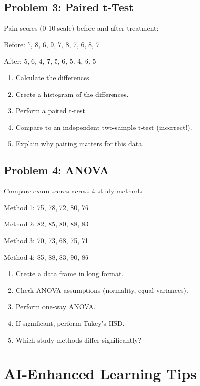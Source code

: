 \documentclass[11pt]{article}
\begin{document}
\subsection{Problem 3: Paired t-Test}

Pain scores (0-10 scale) before and after treatment:

Before: 7, 8, 6, 9, 7, 8, 7, 6, 8, 7

After: 5, 6, 4, 7, 5, 6, 5, 4, 6, 5

\begin{enumerate}[label=\alph*)]
\item Calculate the differences.
\item Create a histogram of the differences.
\item Perform a paired t-test.
\item Compare to an independent two-sample t-test (incorrect!).
\item Explain why pairing matters for this data.
\end{enumerate}

\vspace{2cm}

\subsection{Problem 4: ANOVA}

Compare exam scores across 4 study methods:

Method 1: 75, 78, 72, 80, 76

Method 2: 82, 85, 80, 88, 83

Method 3: 70, 73, 68, 75, 71

Method 4: 85, 88, 83, 90, 86

\begin{enumerate}[label=\alph*)]
\item Create a data frame in long format.
\item Check ANOVA assumptions (normality, equal variances).
\item Perform one-way ANOVA.
\item If significant, perform Tukey's HSD.
\item Which study methods differ significantly?
\end{enumerate}

\vspace{2cm}

\section{\textcolor{aiblue}{AI-Enhanced Learning Tips}}
\end{document}
